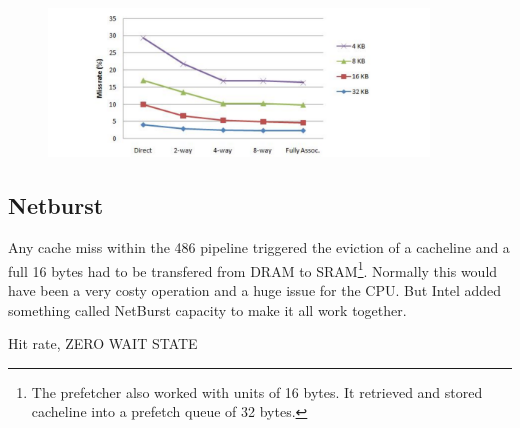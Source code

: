 \par
{}\\
\par


  \begin{figure}[H]
    \centering
    \includegraphics[width=0.9\textwidth]{drawings/set_cache_stats.png}
    \caption{}
  \end{figure}
  \par


\subsection{Netburst}
Any cache miss within the 486 pipeline triggered the eviction of a cacheline and a full 16 bytes had to be transfered from DRAM to SRAM\footnote{The prefetcher also worked with units of 16 bytes. It retrieved and stored cacheline into a prefetch queue of 32 bytes.}. Normally this would have been a very costy operation and a huge issue for the CPU. But Intel added something called NetBurst capacity to make it all work together.\\
\par
Hit rate, ZERO WAIT STATE\\
\par
{}







